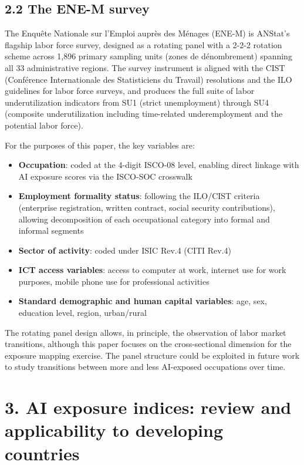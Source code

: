 \documentclass[
  11pt,
]{article}
\providecommand{\tightlist}{%
  \setlength{\itemsep}{0pt}\setlength{\parskip}{0pt}}
\begin{document}
\subsection{2.2 The ENE-M survey}\label{the-ene-m-survey}

The Enquête Nationale sur l'Emploi auprès des Ménages (ENE-M) is
ANStat's flagship labor force survey, designed as a rotating panel with
a 2-2-2 rotation scheme across 1,896 primary sampling units (zones de
dénombrement) spanning all 33 administrative regions. The survey
instrument is aligned with the CIST (Conférence Internationale des
Statisticiens du Travail) resolutions and the ILO guidelines for labor
force surveys, and produces the full suite of labor underutilization
indicators from SU1 (strict unemployment) through SU4 (composite
underutilization including time-related underemployment and the
potential labor force).

For the purposes of this paper, the key variables are:

\begin{itemize}
\tightlist
\item
  \textbf{Occupation}: coded at the 4-digit ISCO-08 level, enabling
  direct linkage with AI exposure scores via the ISCO-SOC crosswalk
\item
  \textbf{Employment formality status}: following the ILO/CIST criteria
  (enterprise registration, written contract, social security
  contributions), allowing decomposition of each occupational category
  into formal and informal segments
\item
  \textbf{Sector of activity}: coded under ISIC Rev.4 (CITI Rev.4)
\item
  \textbf{ICT access variables}: access to computer at work, internet
  use for work purposes, mobile phone use for professional activities
\item
  \textbf{Standard demographic and human capital variables}: age, sex,
  education level, region, urban/rural
\end{itemize}

The rotating panel design allows, in principle, the observation of labor
market transitions, although this paper focuses on the cross-sectional
dimension for the exposure mapping exercise. The panel structure could
be exploited in future work to study transitions between more and less
AI-exposed occupations over time.

\section{3. AI exposure indices: review and applicability to developing
countries}\label{ai-exposure-indices-review-and-applicability-to-developing-countries}
\end{document}
